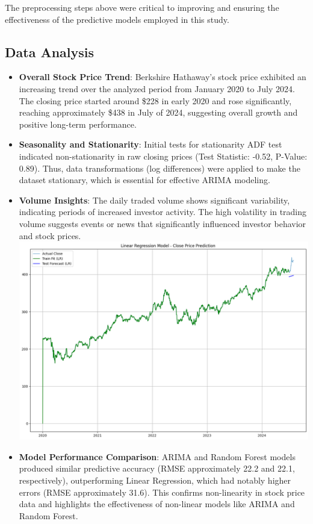 \documentclass[conference]{IEEEtran}
\begin{document}
The preprocessing steps above were critical to improving and ensuring the effectiveness of the predictive models employed in this study.

\subsection{Data Analysis}\label{AA}
\begin{itemize}
    \item \textbf{Overall Stock Price Trend}: Berkshire Hathaway's stock price exhibited an increasing trend over the analyzed period from January 2020 to July 2024. The closing price started around \$228 in early 2020 and rose significantly, reaching approximately \$438 in July of 2024, suggesting overall growth and positive long-term performance.
    \item \textbf{Seasonality and Stationarity}: Initial tests for stationarity ADF test indicated non-stationarity in raw closing prices (Test Statistic: -0.52, P-Value: 0.89). Thus, data transformations (log differences) were applied to make the dataset stationary, which is essential for effective ARIMA modeling.
    \item \textbf{Volume Insights}: The daily traded volume shows significant variability, indicating periods of increased investor activity. The high volatility in trading volume suggests events or news that significantly influenced investor behavior and stock prices.
    \includegraphics[scale=0.25]{screenshots/linreg.png} %
    \item \textbf{Model Performance Comparison}: ARIMA and Random Forest models produced similar predictive accuracy (RMSE approximately 22.2 and 22.1, respectively), outperforming Linear Regression, which had notably higher errors (RMSE approximately 31.6). This confirms non-linearity in stock price data and highlights the effectiveness of non-linear models like ARIMA and Random Forest.

\end{itemize}
\end{document}

